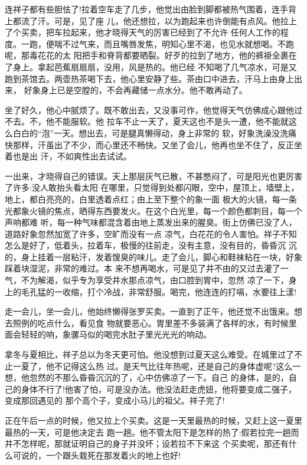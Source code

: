 \documentclass[11pt,a4paper,onecolumn]{article}
\begin{document}
连祥子都有些胆怯了!拉着空车走了几步，他觉出由脸到脚都被热气围着，连手背上都流了汗。可是，见了座
儿，他还想拉，以为跑起来也许倒能有点风。他拉上了个买卖，把车拉起来，他才晓得天气的厉害已经到了不允许
任何人工作的程度。一跑，便喘不过气来，而且嘴唇发焦，明知心里不渴，也见水就想喝。不跑呢，那毒花花的太
阳把手和脊背都要晒裂。好歹的拉到了地方，他的裤褂全裹在了身上。拿起芭蕉扇扇扇，没用，风是热的。他已经
不知喝了几气凉水，可是又跑到茶馆去。两壶热茶喝下去，他心里安静了些。茶由口中进去，汗马上由身上出来，
好象身上已是空膛的，不会再藏储一点水分。他不敢再动了。

坐了好久，他心中腻烦了。既不敢出去，又没事可作，他觉得天气仿佛成心跟他过不去。不，他不能服软。他
拉车不止一天了，夏天这也不是头一遭，他不能就这么白白的``泡''一天。想出去，可是腿真懒得动，身上非常的
软，好象洗澡没洗痛快那样，汗虽出了不少，而心里还不畅快。又坐了会儿，他再也坐不住了，反正坐着也是出
汗，不如爽性出去试试。

一出来，才晓得自己的错误。天上那层灰气已散，不甚憋闷了，可是阳光也更厉害了许多:没人敢抬头看太阳
在哪里，只觉得到处都闪眼，空中，屋顶上，墙壁上，地上，都白亮亮的，白里透着点红；由上至下整个的象一面
极大的火镜，每一条光都象火镜的焦点，晒得东西要发火。在这个白光里，每一个颜色都刺目，每一个声响都难
听，每一种气味都混含着由地上蒸发出来的腥臭。街上仿佛已没了人，道路好象忽然加宽了许多，空旷而没有一点
凉气，白花花的令人害怕。祥子不知怎么是好了，低着头，拉着车，极慢的往前走，没有主意，没有目的，昏昏沉
沉的，身上挂着一层粘汗，发着馊臭的味儿。走了会儿，脚心和鞋袜粘在一块，好象踩着块湿泥，非常的难过。本
来不想再喝水，可是见了井不由的又过去灌了一气，不为解渴，似乎专为享受井水那点凉气，由口腔到胃中，忽然
凉了一下，身上的毛孔猛的一收缩，打个冷战，非常舒服。喝完，他连连的打嗝，水要往上漾!

走一会儿，坐一会儿，他始终懒得张罗买卖。一直到了正午，他还觉不出饿来。想去照例的吃点什么，看见食
物就要恶心。胃里差不多装满了各样的水，有时候里面会轻轻的响，象骡马似的喝完水肚子里光光光的响动。

拿冬与夏相比，祥子总以为冬天更可怕。他没想到过夏天这么难受。在城里过了不止一夏了，他不记得这么热
过。是天气比往年热呢，还是自己的身体虚呢?这么一想，他忽然的不那么昏昏沉沉的了，心中仿佛凉了一下。自己
的身体，是的，自己的身体不行了!他害了怕，可是没办法。他没法赶走虎妞，他将要变成二强子，变成那回遇见的
那个高个子，变成小马儿的祖父。祥子完了!

正在午后一点的时候，他又拉上个买卖。这是一天里最热的时候，又赶上这一夏里最热的一天，可是他决定去
跑一趟。他不管太阳下是怎样的热了:假若拉完一趟而并不怎样呢，那就证明自己的身子并没坏；设若拉不下来这
个买卖呢，那还有什么可说的，一个跟头栽死在那发着火的地上也好!
\end{document}
